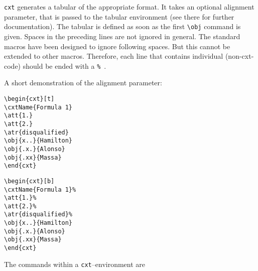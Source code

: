 \documentclass[12pt]{article}
\begin{document}
\texttt{cxt} generates a tabular of the appropriate format. It takes
an optional alignment parameter, that is passed to the tabular
environment (see there for further documentation). The tabular is
defined as soon as the first \verb|\obj| command is given. Spaces in the 
preceding lines are not ignored in general. The standard macros have
been designed to ignore following spaces. But this cannot be extended
to other macros. Therefore, each line that contains individual
(non-cxt-code) should be ended with a \texttt{\%}\ .

A short demonstration of the alignment parameter:
\medbreak

\noindent\begin{minipage}{.45\textwidth}
\begin{verbatim}
\begin{cxt}[t]
\cxtName{Formula 1}
\att{1.}
\att{2.}
\atr{disqualified}
\obj{x..}{Hamilton}
\obj{.x.}{Alonso}
\obj{.xx}{Massa}
\end{cxt}
\end{verbatim}
\end{minipage}
\hfill
\begin{minipage}{.45\textwidth}
\begin{verbatim}
\begin{cxt}[b]
\cxtName{Formula 1}%
\att{1.}%
\att{2.}%
\atr{disqualified}%
\obj{x..}{Hamilton}
\obj{.x.}{Alonso}
\obj{.xx}{Massa}
\end{cxt}
\end{verbatim}
\end{minipage}

\noindent\hfill\begin{cxt}[t]
\end{cxt}%
\begin{cxt}[b]
\end{cxt}\hfill\strut
\bigbreak
 
The commands within a \texttt{cxt}--environment are
\end{document}
